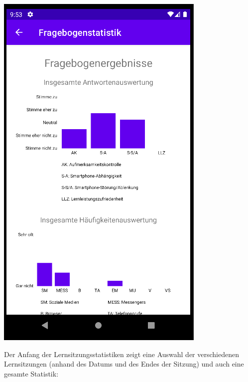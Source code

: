 \documentclass[ngerman]{tutorial}
\begin{document}
\begin{center}
    \includegraphics[scale=0.45]{stats_survey.png}
\end{center}
\newpage
\noindent Der Anfang der Lernsitzungsstatistiken zeigt eine Auswahl der verschiedenen Lernsitzungen (anhand des Datums und des Endes der Sitzung) und auch eine gesamte Statistik:
\end{document}
